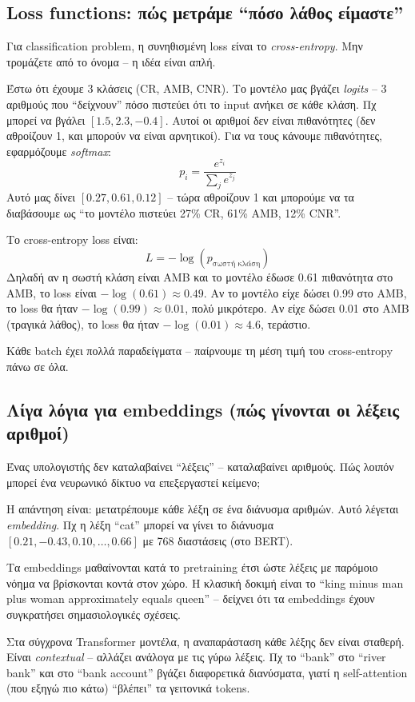 \documentclass[12pt]{fphw}
\begin{document}
\subsection{Loss functions: πώς μετράμε ``πόσο λάθος είμαστε''}

Για classification problem, η συνηθισμένη loss είναι το \emph{cross-entropy}. Μην τρομάζετε από το όνομα -- η ιδέα είναι απλή.

Έστω ότι έχουμε 3 κλάσεις (CR, AMB, CNR). Το μοντέλο μας βγάζει \emph{logits} -- 3 αριθμούς που ``δείχνουν'' πόσο πιστεύει ότι το input ανήκει σε κάθε κλάση. Πχ μπορεί να βγάλει $[1.5, 2.3, -0.4]$. Αυτοί οι αριθμοί δεν είναι πιθανότητες (δεν αθροίζουν 1, και μπορούν να είναι αρνητικοί). Για να τους κάνουμε πιθανότητες, εφαρμόζουμε \emph{softmax}:
\[
p_i = \frac{e^{z_i}}{\sum_j e^{z_j}}
\]
Αυτό μας δίνει $[0.27, 0.61, 0.12]$ -- τώρα αθροίζουν 1 και μπορούμε να τα διαβάσουμε ως ``το μοντέλο πιστεύει 27\% CR, 61\% AMB, 12\% CNR''.

Το cross-entropy loss είναι:
\[
L = -\log(p_{\text{σωστή κλάση}})
\]
Δηλαδή αν η σωστή κλάση είναι AMB και το μοντέλο έδωσε 0.61 πιθανότητα στο AMB, το loss είναι $-\log(0.61) \approx 0.49$. Αν το μοντέλο είχε δώσει 0.99 στο AMB, το loss θα ήταν $-\log(0.99) \approx 0.01$, πολύ μικρότερο. Αν είχε δώσει 0.01 στο AMB (τραγικά λάθος), το loss θα ήταν $-\log(0.01) \approx 4.6$, τεράστιο.

Κάθε batch έχει πολλά παραδείγματα -- παίρνουμε τη μέση τιμή του cross-entropy πάνω σε όλα.

\subsection{Λίγα λόγια για embeddings (πώς γίνονται οι λέξεις αριθμοί)}

Ένας υπολογιστής δεν καταλαβαίνει ``λέξεις'' -- καταλαβαίνει αριθμούς. Πώς λοιπόν μπορεί ένα νευρωνικό δίκτυο να επεξεργαστεί κείμενο;

Η απάντηση είναι: μετατρέπουμε κάθε λέξη σε ένα διάνυσμα αριθμών. Αυτό λέγεται \emph{embedding}. Πχ η λέξη ``cat'' μπορεί να γίνει το διάνυσμα $[0.21, -0.43, 0.10, \dots, 0.66]$ με 768 διαστάσεις (στο BERT).

Τα embeddings μαθαίνονται κατά το pretraining έτσι ώστε λέξεις με παρόμοιο νόημα να βρίσκονται κοντά στον χώρο. Η κλασική δοκιμή είναι το ``king minus man plus woman approximately equals queen'' -- δείχνει ότι τα embeddings έχουν συγκρατήσει σημασιολογικές σχέσεις.

Στα σύγχρονα Transformer μοντέλα, η αναπαράσταση κάθε λέξης δεν είναι σταθερή. Είναι \emph{contextual} -- αλλάζει ανάλογα με τις γύρω λέξεις. Πχ το ``bank'' στο ``river bank'' και στο ``bank account'' βγάζει διαφορετικά διανύσματα, γιατί η self-attention (που εξηγώ πιο κάτω) ``βλέπει'' τα γειτονικά tokens.
\end{document}
